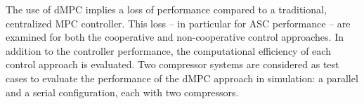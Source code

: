 The use of dMPC implies a loss of performance compared to a traditional, centralized MPC controller.
This loss -- in particular for ASC performance -- are examined for both the cooperative and non-cooperative control approaches.
In addition to the controller performance, the computational efficiency of each control approach is evaluated.
Two compressor systems are considered as test cases to evaluate the performance of the dMPC approach in simulation: a parallel and a serial configuration, each with two compressors.

